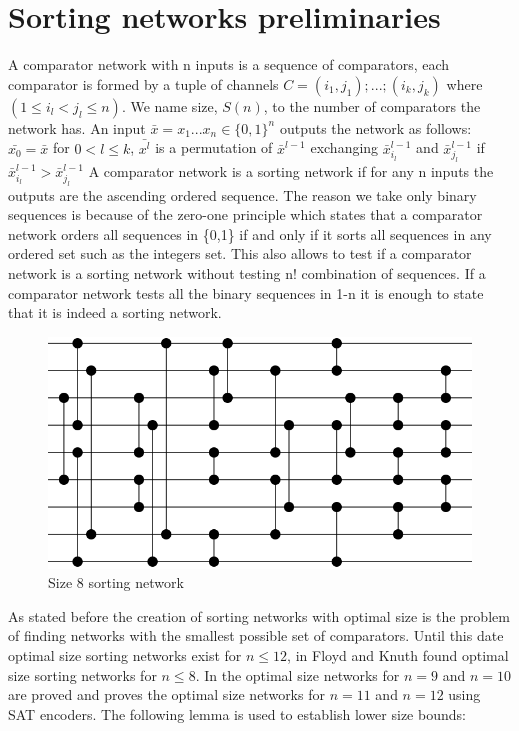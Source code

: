\documentclass[../main.tex]{subfiles}
\begin{document}
	\section{Sorting networks preliminaries}
	A comparator network with n inputs is a sequence of comparators, each comparator is formed by a tuple of channels $C=(i_1,j_1);...;(i_k,j_k)$ where $(1 \leq i_l < j_l \leq n)$. We name size, $S(n)$, to the number of comparators the network has. An input $\bar{x}=x_1...x_n \in \{0, 1\}^n$ outputs the network as follows: $\bar{x_0}=\bar{x}$ for $0<l\leq k$, $\bar{x^l}$ is a permutation of $\bar x^{l-1}$ exchanging $\bar x^{l-1}_{i_l}$ and $\bar x^{l-1}_{j_l}$ if $\bar x^{l-1}_{i_l} > \bar x^{l-1}_{j_l}$
	A comparator network is a sorting network if for any n inputs the outputs are the ascending ordered sequence. The reason we take only binary sequences is because of the zero-one principle\cite{knuth1997art} which states that a comparator network orders all sequences in \{0,1\} if and only if it sorts all sequences in any ordered set such as the integers set. This also allows to test if a comparator network is a sorting network without testing n! combination of sequences. If a comparator network tests all the binary sequences in 1-n it is enough to state that it is indeed a sorting network.
	
	\begin{figure}[H]
		\centering
		\includegraphics[scale=0.8]{images/Size8SortingNetwork}
		\caption{Size 8 sorting network}
		\label{fig:images/Size8SortingNetwork}
	\end{figure}

	As stated before the creation of sorting networks with optimal size is the problem of finding networks with the smallest possible set of comparators. Until this date optimal size sorting networks exist for $n \leq 12$, in \cite{FLOYD1973163} Floyd and Knuth found optimal size sorting networks for $n \leq 8$. In \cite{sortingnineinputs} the optimal size networks for $n = 9$ and $n = 10$ are proved and \cite{harder2021answer} proves the optimal size networks for $n = 11$ and $n = 12$ using SAT encoders. The following lemma \cite{VanVoorhis1972} is used to establish lower size bounds:
	
\end{document}
